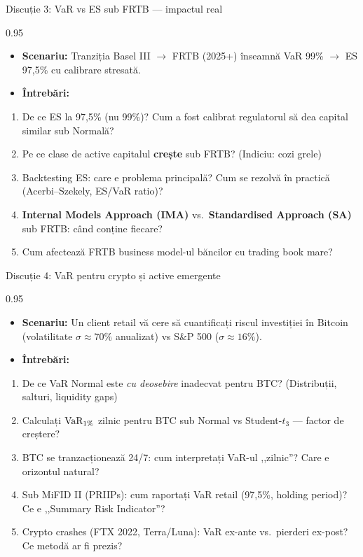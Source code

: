 \documentclass[9pt, aspectratio=169, t]{beamer}
\begin{document}
\begin{frame}[shrink=10]{Discuție 3: VaR vs ES sub FRTB --- impactul real}
\begin{cminipage}{0.95\textwidth}
    \begin{itemize}\setlength{\itemsep}{0pt}
        \item \textbf{Scenariu:} Tranziția Basel III $\to$ FRTB (2025+) înseamnă VaR 99\% $\to$ ES 97{,}5\% cu calibrare stresată.
        \item \textbf{Întrebări:}
    \end{itemize}
    \begin{enumerate}\setlength{\itemsep}{0pt}
        \item De ce ES la 97{,}5\% (nu 99\%)? Cum a fost calibrat regulatorul să dea capital similar sub Normală?
        \item Pe ce clase de active capitalul \textbf{crește} sub FRTB? (Indiciu: cozi grele)
        \item Backtesting ES: care e problema principală? Cum se rezolvă în practică (Acerbi--Szekely, ES/VaR ratio)?
        \item \textbf{Internal Models Approach (IMA)} vs.\ \textbf{Standardised Approach (SA)} sub FRTB: când conține fiecare?
        \item Cum afectează FRTB business model-ul băncilor cu trading book mare?
    \end{enumerate}
\end{cminipage}
\end{frame}

\begin{frame}[shrink=10]{Discuție 4: VaR pentru crypto și active emergente}
\begin{cminipage}{0.95\textwidth}
    \begin{itemize}\setlength{\itemsep}{0pt}
        \item \textbf{Scenariu:} Un client retail vă cere să cuantificați riscul investiției în Bitcoin (volatilitate $\sigma \approx 70\%$ anualizat) vs S\&P 500 ($\sigma \approx 16\%$).
        \item \textbf{Întrebări:}
    \end{itemize}
    \begin{enumerate}\setlength{\itemsep}{0pt}
        \item De ce VaR Normal este \textit{cu deosebire} inadecvat pentru BTC? (Distribuții, salturi, liquidity gaps)
        \item Calculați $\text{VaR}_{1\%}$ zilnic pentru BTC sub Normal vs Student-$t_3$ --- factor de creștere?
        \item BTC se tranzacționează 24/7: cum interpretați VaR-ul ,,zilnic''? Care e orizontul natural?
        \item Sub MiFID II (PRIIPs): cum raportați VaR retail (97{,}5\%, holding period)? Ce e ,,Summary Risk Indicator''?
        \item Crypto crashes (FTX 2022, Terra/Luna): VaR ex-ante vs.\ pierderi ex-post? Ce metodă ar fi prezis?
    \end{enumerate}
\end{cminipage}
\end{frame}
\end{document}
